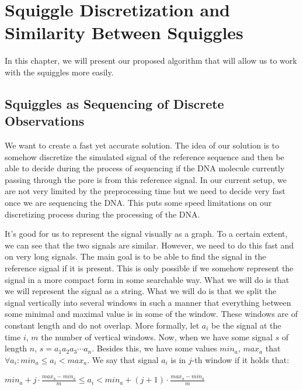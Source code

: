 \chapter{Squiggle Discretization and Similarity Between Squiggles}

\label{kap:proposedMethod} %

In this chapter, we will present our proposed algorithm that will allow us to work
with the squiggles more easily.

\section{Squiggles as Sequencing of Discrete Observations}

We want to create a fast yet accurate solution. The idea of our solution is to somehow
discretize the simulated signal of the reference sequence and then be able to decide
during the process of sequencing if the DNA molecule currently passing through the
pore is from this reference signal. In our current setup, we are not very limited
by the preprocessing time but we need to decide very fast once we are sequencing
the DNA. This puts some speed limitations on our discretizing process during the
processing of the DNA.

It's good for us to represent the signal visually as a graph. To a certain extent, we
can see that the two signals are similar. However, we need to do this fast and on very
long signals. The main goal is to be able to find the signal in the reference
signal if it is present. This is only possible if we somehow represent the signal
in a more compact form in some searchable way. What we will do is that we will
represent the signal as a string. What we will do is that we split the signal vertically
into several windows in such a manner that everything between some minimal and maximal
value is in some of the window. These windows are of constant length and do not
overlap. More formally, let $a_i$ be the signal at the time $i$, $m$ the number of
vertical windows. Now, when we have some signal $s$ of length $n$, $s=a_1a_2a_3\cdots a_n$.
Besides this, we have some values $min_a$, $max_a$ that $\forall a_i: min_a \leq a_i < max_a$. We say that signal $a_i$ is in $j$-th
window if it holds that:

\begin{center}
$min_a + j\cdot \frac{max_a-min_a}{m} \leq a_i < min_a + (j+1)\cdot \frac{max_a-min_a}{m}$
\end{center}

